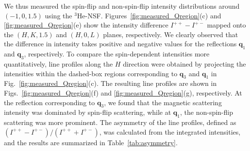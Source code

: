 \documentclass[%
 reprint,
superscriptaddress,
 amsmath,amssymb,
 aps,
floatfix,
]{revtex4-2}
\newcommand{\Hensf}{$^3$He-NSF}
\begin{document}
We thus measured the spin-flip and non-spin-flip intensity distributions around $(-1,0,1.5)$ using the \Hensf.
Figures~\ref{fig:measured_Qregion}(c) and \ref{fig:measured_Qregion}(e) show the intensity difference $I^{++}-I^{+-}$ mapped onto the $(H,K,1.5)$ and $(H,0,L)$ planes, respectively.
We clearly observed that the difference in intensity takes positive and negative values for the reflections $\boldsymbol{q}_1$ and $\boldsymbol{q}_3$, respectively.
To compare the spin-dependent intensities more quantitatively, line profiles along the $H$ direction were obtained by projecting the intensities within the dashed-box regions corresponding to $\boldsymbol{q}_3$ and $\boldsymbol{q}_1$ in Fig.~\ref{fig:measured_Qregion}(c).
The resulting line profiles are shown in Figs.~\ref{fig:measured_Qregion}(f) and \ref{fig:measured_Qregion}(g), respectively.
At the reflection corresponding to $\boldsymbol{q}_3$, we found that the magnetic scattering intensity was dominated by spin-flip scattering, while at $\boldsymbol{q}_1$, the non-spin-flip scattering was more prominent.
The asymmetry of the line profiles, defined as $(I^{++}-I^{+-})/(I^{++}+I^{+-})$, was calculated from the integrated intensities, and the results are summarized in Table~\ref{tab:asymmetry}.
\end{document}
